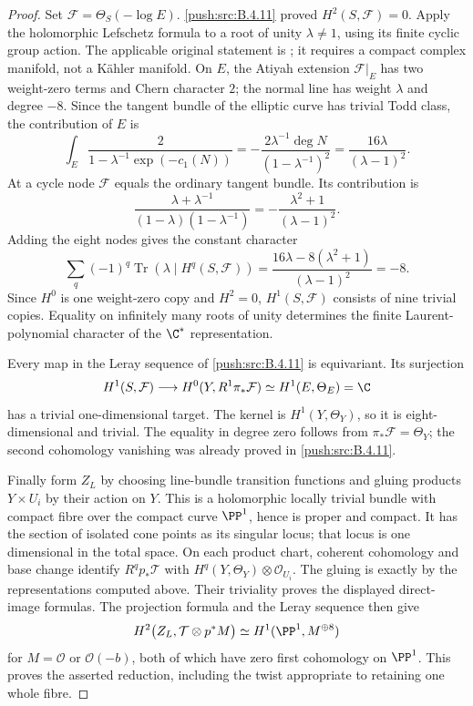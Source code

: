 \begin{proof}
Set $\mathcal F=\Theta_S(-\log E)$.
\ref{push:src:B.4.11} proved $H^2(S,\mathcal F)=0$.
Apply the holomorphic Lefschetz formula to a root of unity
$\lambda\ne1$, using its finite cyclic group action.
The applicable original statement is
\citet[Theorem~(4.6), p.~566]{AtiyahSinger1968IIIE}; it requires
a compact complex manifold, not a K\"ahler manifold.
On $E$, the Atiyah extension $\mathcal F|_E$ has two
weight-zero terms and Chern character $2$; the normal line
has weight $\lambda$ and degree $-8$.
Since the tangent bundle of the elliptic curve has trivial
Todd class, the contribution of $E$ is
\[
 \int_E\frac{2}{1-\lambda^{-1}\exp(-c_1(N))}
   =-\frac{2\lambda^{-1}\deg N}
           {(1-\lambda^{-1})^2}
   =\frac{16\lambda}{(\lambda-1)^2}.
\]
At a cycle node $\mathcal F$ equals the ordinary tangent
bundle.  Its contribution is
\[
 \frac{\lambda+\lambda^{-1}}
      {(1-\lambda)(1-\lambda^{-1})}
   =-\frac{\lambda^2+1}{(\lambda-1)^2}.
\]
Adding the eight nodes gives the constant character
\[
 \sum_q(-1)^q\operatorname{Tr}
       (\lambda\mid H^q(S,\mathcal F))
 =\frac{16\lambda-8(\lambda^2+1)}{(\lambda-1)^2}
 =-8.
\]
Since $H^0$ is one weight-zero copy and $H^2=0$,
$H^1(S,\mathcal F)$ consists of nine trivial copies.
Equality on infinitely many roots of unity determines the
finite Laurent-polynomial character of the $\C^*$ representation.

Every map in the Leray sequence of \ref{push:src:B.4.11} is equivariant.
Its surjection
\[
 H^1(S,\mathcal F)\longrightarrow
 H^0(Y,R^1\pi_*\mathcal F)
       \simeq H^1(E,\Theta_E)=\C
\]
has a trivial one-dimensional target.
The kernel is $H^1(Y,\Theta_Y)$, so it is eight-dimensional
and trivial.  The equality in degree zero follows from
$\pi_*\mathcal F=\Theta_Y$; the second cohomology vanishing
was already proved in \ref{push:src:B.4.11}.

Finally form $Z_L$ by choosing line-bundle transition functions
and gluing products $Y\times U_i$ by their action on $Y$.
This is a holomorphic locally trivial bundle with compact
fibre over the compact curve $\PP^1$, hence is proper and
compact.  It has the section of isolated cone points as its
singular locus; that locus is one dimensional in the total
space.  On each product chart, coherent cohomology and base
change identify $R^qp_*\mathcal T$ with
$H^q(Y,\Theta_Y)\otimes\mathcal O_{U_i}$.
The gluing is exactly by the representations computed above.
Their triviality proves the displayed direct-image formulas.
The projection formula and the Leray sequence then give
\[
 H^2\bigl(Z_L,\mathcal T\otimes p^*M\bigr)
      \simeq H^1(\PP^1,M^{\oplus8})
\]
for $M=\mathcal O$ or $\mathcal O(-b)$, both of which have
zero first cohomology on $\PP^1$.
This proves the asserted reduction, including the twist
appropriate to retaining one whole fibre.


\end{proof}
